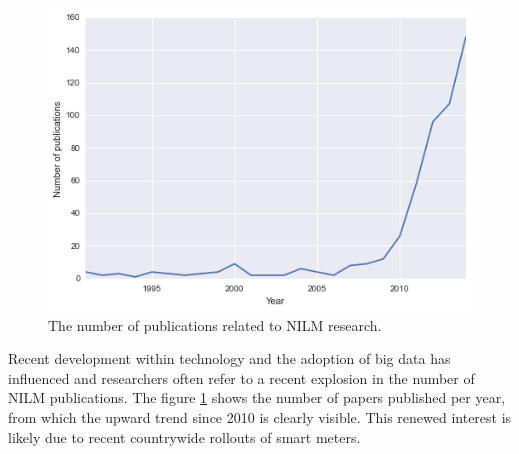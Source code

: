 \begin{figure}[H]
	\centering
	\includegraphics[scale=0.43]{./figures/growth}
	\caption{The number of publications related to NILM research. \protect\footnotemark}
	\label{fig:growth}
\end{figure}%
Recent development within technology and the adoption of big data has influenced and researchers often refer to a recent explosion in the number of NILM publications. The figure \ref{fig:growth} shows the number of papers published per year, from which the upward trend since 2010 is clearly visible. This renewed interest is likely due to recent countrywide rollouts of smart meters. 

